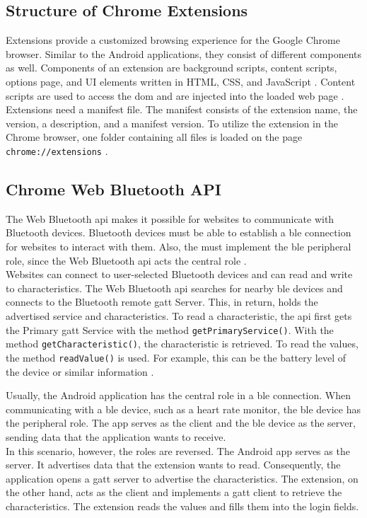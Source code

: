 \subsection{Structure of Chrome Extensions}
Extensions provide a customized browsing experience for the Google Chrome browser. Similar to the Android applications, they consist of different components as well. Components of an extension are background scripts, content scripts, options page, and UI elements written in HTML, CSS, and JavaScript \cite{Extensions}. Content scripts are used to access the \gls{dom} and are injected into the loaded web page \cite{LiuZYC12}. \\
Extensions need a manifest file. The manifest consists of the extension name, the version, a description, and a manifest version. To utilize the extension in the Chrome browser, one folder containing all files is loaded on the page \texttt{chrome://extensions} \cite{Extensions}.


\subsection{Chrome Web Bluetooth API}
The Web Bluetooth \gls{api} makes it possible for websites to communicate with Bluetooth devices. Bluetooth devices must be able to establish a \gls{ble} connection for websites to interact with them. Also, the must implement the \gls{ble} peripheral role, since the Web Bluetooth \gls{api} acts the central role \cite{BTAPIMozilla}. \\
Websites can connect to user-selected Bluetooth devices and can read and write to characteristics. The Web Bluetooth \gls{api} searches for nearby \gls{ble} devices and connects to the Bluetooth remote \gls{gatt} Server. This, in return, holds the advertised service and characteristics. To read a characteristic, the \gls{api} first gets the Primary \gls{gatt} Service with the method \texttt{getPrimaryService()}. With the method \texttt{getCharacteristic()}, the characteristic is retrieved. To read the values, the method \texttt{readValue()} is used. For example, this can be the battery level of the device or similar information \cite{WebBTAPI}.

Usually, the Android application has the central role in a \gls{ble} connection. When communicating with a \gls{ble} device, such as a heart rate monitor, the \gls{ble} device has the peripheral role. The app serves as the client and the \gls{ble} device as the server, sending data that the application wants to receive. \\
In this scenario, however, the roles are reversed. The Android app serves as the server. It advertises data that the extension wants to read. Consequently, the application opens a \gls{gatt} server to advertise the characteristics. The extension, on the other hand, acts as the client and implements a \gls{gatt} client to retrieve the characteristics. The extension reads the values and fills them into the login fields. \\